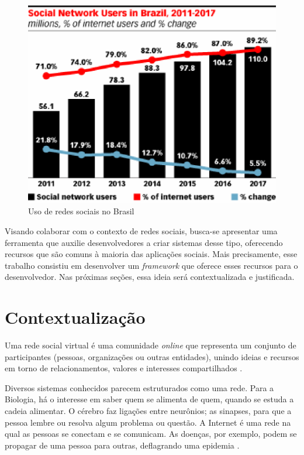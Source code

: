 \begin{figure}[!h]
	\centering
	\includegraphics[scale=0.8]{figuras/capitulo1/social_network_brazil.eps}
	\caption[Uso de redes sociais no Brasil]{Uso de redes sociais no Brasil \cite{eMarketer:2013}}
	\label{social_network_brazil}
\end{figure}

Visando colaborar com o contexto de redes sociais, busca-se apresentar uma ferramenta que auxilie desenvolvedores a criar sistemas desse tipo, oferecendo recursos que são comuns à maioria das aplicações sociais. Mais precisamente, esse trabalho consistiu em desenvolver um \textit{framework} que oferece esses recursos para o desenvolvedor. Nas próximas seções, essa ideia será contextualizada e justificada.

\section*{Contextualização}

Uma rede social virtual é uma comunidade \textit{online} que representa um conjunto de participantes (pessoas, organizações ou outras entidades), unindo ideias e recursos em torno de relacionamentos, valores e interesses compartilhados \cite{Marteleto:2001}.

Diversos sistemas conhecidos parecem estruturados como uma rede. Para a Biologia, há o interesse em saber quem se alimenta de quem, quando se estuda a cadeia alimentar. O cérebro faz ligações entre neurônios; as sinapses, para que a pessoa lembre ou resolva algum problema ou questão. A Internet é uma rede na qual as pessoas se conectam e se comunicam. As doenças, por exemplo, podem se propagar de uma pessoa para outras, deflagrando uma epidemia \cite{Goular:2014}.

